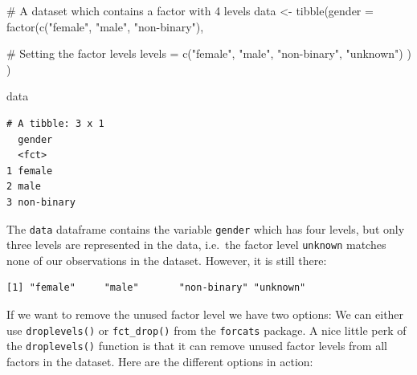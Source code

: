 \documentclass[
  letterpaper,
]{krantz}
\makeatletter
\newenvironment{Shaded}{\begin{snugshade}}{\end{snugshade}}
\newcommand{\AttributeTok}[1]{\textcolor[rgb]{0.40,0.45,0.13}{#1}}
\newcommand{\CommentTok}[1]{\textcolor[rgb]{0.37,0.37,0.37}{#1}}
\newcommand{\FunctionTok}[1]{\textcolor[rgb]{0.28,0.35,0.67}{#1}}
\newcommand{\NormalTok}[1]{\textcolor[rgb]{0.00,0.23,0.31}{#1}}
\newcommand{\OtherTok}[1]{\textcolor[rgb]{0.00,0.23,0.31}{#1}}
\newcommand{\SpecialCharTok}[1]{\textcolor[rgb]{0.37,0.37,0.37}{#1}}
\newcommand{\StringTok}[1]{\textcolor[rgb]{0.13,0.47,0.30}{#1}}
\newenvironment{kframe}{%
\medskip{}
\setlength{\fboxsep}{.8em}
 \def\at@end@of@kframe{}%
 \ifinner\ifhmode%
  \def\at@end@of@kframe{\end{minipage}}%
  \begin{minipage}{\columnwidth}%
 \fi\fi%
 \def\FrameCommand##1{\hskip\@totalleftmargin \hskip-\fboxsep
 \colorbox{shadecolor}{##1}\hskip-\fboxsep
     \hskip-\linewidth \hskip-\@totalleftmargin \hskip\columnwidth}%
 \MakeFramed {\advance\hsize-\width
   \@totalleftmargin\z@ \linewidth\hsize
   \@setminipage}}%
 {\par\unskip\endMakeFramed%
 \at@end@of@kframe}
\renewenvironment{Shaded}{\begin{kframe}}{\end{kframe}}
\makeatother
\begin{document}
\begin{Shaded}
\begin{Highlighting}[]
\CommentTok{\# A dataset which contains a factor with 4 levels}
\NormalTok{data }\OtherTok{\textless{}{-}} \FunctionTok{tibble}\NormalTok{(}\AttributeTok{gender =} \FunctionTok{factor}\NormalTok{(}\FunctionTok{c}\NormalTok{(}\StringTok{"female"}\NormalTok{,}
                                 \StringTok{"male"}\NormalTok{,}
                                 \StringTok{"non{-}binary"}\NormalTok{),}
                               
                               \CommentTok{\# Setting the factor levels}
                               \AttributeTok{levels =} \FunctionTok{c}\NormalTok{(}\StringTok{"female"}\NormalTok{,}
                                          \StringTok{"male"}\NormalTok{,}
                                          \StringTok{"non{-}binary"}\NormalTok{,}
                                          \StringTok{"unknown"}\NormalTok{)}
\NormalTok{                               )}
\NormalTok{               )}

\NormalTok{data}
\end{Highlighting}
\end{Shaded}

\begin{verbatim}
# A tibble: 3 x 1
  gender    
  <fct>     
1 female    
2 male      
3 non-binary
\end{verbatim}

The \texttt{data} dataframe contains the variable \texttt{gender} which
has four levels, but only three levels are represented in the data,
i.e.~the factor level \texttt{unknown} matches none of our observations
in the dataset. However, it is still there:

\begin{Shaded}
\end{Shaded}

\begin{verbatim}
[1] "female"     "male"       "non-binary" "unknown"   
\end{verbatim}

If we want to remove the unused factor level we have two options: We can
either use \texttt{droplevels()} or \texttt{fct\_drop()} from the
\texttt{forcats} package. A nice little perk of the
\texttt{droplevels()} function is that it can remove unused factor
levels from all factors in the dataset. Here are the different options
in action:
\end{document}
